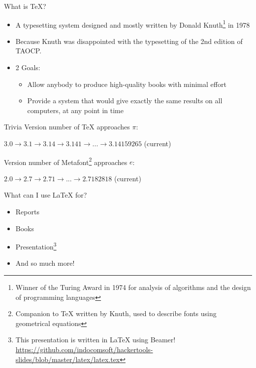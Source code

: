 \documentclass[12pt]{beamer}
\begin{document}
\begin{frame}{What is \TeX{}?}
  \begin{itemize}
    \item A typesetting system designed and mostly written by Donald Knuth\footnote{Winner of the Turing Award in 1974 for analysis of algorithms and the design of programming languages} in 1978
    \item Because Knuth was disappointed with the typesetting of the 2nd edition of TAOCP.
    \item 2 Goals:
          \begin{itemize}
            \item Allow anybody to produce high-quality books with minimal effort
            \item Provide a system that would give exactly the same results on all computers, at any point in time
          \end{itemize}
  \end{itemize}
\end{frame}

\begin{frame}{Trivia}
  Version number of \TeX{} approaches $\pi$:

  $3.0 \rightarrow 3.1 \rightarrow 3.14 \rightarrow 3.141 \rightarrow ... \rightarrow 3.14159265$ (current)

  Version number of Metafont\footnote{Companion to \TeX{} written by Knuth, used to describe fonts using geometrical equations} approaches $e$:

  $2.0 \rightarrow 2.7 \rightarrow 2.71 \rightarrow ... \rightarrow 2.7182818$ (current)
\end{frame}

\begin{frame}{What can I use \LaTeX{} for?}
  \begin{itemize}
    \item Reports
    \item Books
    \item Presentation\footnote{This presentation is written in \LaTeX{} using Beamer! \url{https://github.com/indocomsoft/hackertools-slides/blob/master/latex/latex.tex}}
    \item And so much more!
  \end{itemize}
\end{frame}
\end{document}
